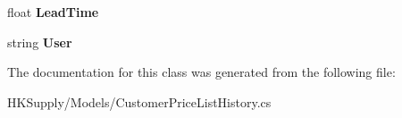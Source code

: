 \begin{DoxyCompactItemize}
\item 
\mbox{\label{class_h_k_supply_1_1_models_1_1_customer_price_list_history_a3b7b38dbcca265ee74faee2b39bd84c6}} 
float {\bfseries Lead\+Time}
\item 
\mbox{\label{class_h_k_supply_1_1_models_1_1_customer_price_list_history_ae6d95c28e6604b01f2e491d80fae854c}} 
string {\bfseries User}
\end{DoxyCompactItemize}


The documentation for this class was generated from the following file\+:\begin{DoxyCompactItemize}
\item 
H\+K\+Supply/\+Models/Customer\+Price\+List\+History.\+cs\end{DoxyCompactItemize}
